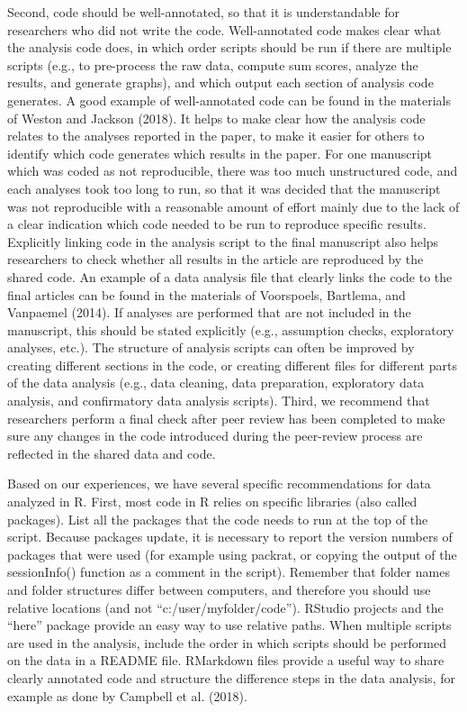 \documentclass[
  ,jou, a4paper,floatsintext]{apa6}
\begin{document}
Second, code should be well-annotated, so that it is understandable for researchers who did not write the code. Well-annotated code makes clear what the analysis code does, in which order scripts should be run if there are multiple scripts (e.g., to pre-process the raw data, compute sum scores, analyze the results, and generate graphs), and which output each section of analysis code generates. A good example of well-annotated code can be found in the materials of Weston and Jackson (2018). It helps to make clear how the analysis code relates to the analyses reported in the paper, to make it easier for others to identify which code generates which results in the paper. For one manuscript which was coded as not reproducible, there was too much unstructured code, and each analyses took too long to run, so that it was decided that the manuscript was not reproducible with a reasonable amount of effort mainly due to the lack of a clear indication which code needed to be run to reproduce specific results. Explicitly linking code in the analysis script to the final manuscript also helps researchers to check whether all results in the article are reproduced by the shared code. An example of a data analysis file that clearly links the code to the final articles can be found in the materials of Voorspoels, Bartlema, and Vanpaemel (2014). If analyses are performed that are not included in the manuscript, this should be stated explicitly (e.g., assumption checks, exploratory analyses, etc.). The structure of analysis scripts can often be improved by creating different sections in the code, or creating different files for different parts of the data analysis (e.g., data cleaning, data preparation, exploratory data analysis, and confirmatory data analysis scripts). Third, we recommend that researchers perform a final check after peer review has been completed to make sure any changes in the code introduced during the peer-review process are reflected in the shared data and code.

Based on our experiences, we have several specific recommendations for data analyzed in R. First, most code in R relies on specific libraries (also called packages). List all the packages that the code needs to run at the top of the script. Because packages update, it is necessary to report the version numbers of packages that were used (for example using packrat, or copying the output of the sessionInfo() function as a comment in the script). Remember that folder names and folder structures differ between computers, and therefore you should use relative locations (and not \enquote{c:/user/myfolder/code}). RStudio projects and the \enquote{here} package provide an easy way to use relative paths. When multiple scripts are used in the analysis, include the order in which scripts should be performed on the data in a README file. RMarkdown files provide a useful way to share clearly annotated code and structure the difference steps in the data analysis, for example as done by Campbell et al. (2018).
\end{document}
